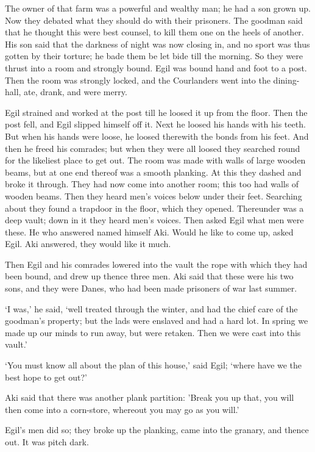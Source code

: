 The owner of that farm was a powerful and wealthy man; he had a son grown up. Now they debated what they should do with their prisoners. The goodman said that he thought this were best counsel, to kill them one on the heels of another. His son said that the darkness of night was now closing in, and no sport was thus gotten by their torture; he bade them be let bide till the morning. So they were thrust into a room and strongly bound. Egil was bound hand and foot to a post. Then the room was strongly locked, and the Courlanders went into the dining-hall, ate, drank, and were merry.

Egil strained and worked at the post till he loosed it up from the floor. Then the post fell, and Egil slipped himself off it. Next he loosed his hands with his teeth. But when his hands were loose, he loosed therewith the bonds from his feet. And then he freed his comrades; but when they were all loosed they searched round for the likeliest place to get out. The room was made with walls of large wooden beams, but at one end thereof was a smooth planking. At this they dashed and broke it through. They had now come into another room; this too had walls of wooden beams. Then they heard men's voices below under their feet. Searching about they found a trapdoor in the floor, which they opened. Thereunder was a deep vault; down in it they heard men's voices. Then asked Egil what men were these. He who answered named himself Aki. Would he like to come up, asked Egil. Aki answered, they would like it much.

Then Egil and his comrades lowered into the vault the rope with which they had been bound, and drew up thence three men. Aki said that these were his two sons, and they were Danes, who had been made prisoners of war last summer.

`I was,' he said, `well treated through the winter, and had the chief care of the goodman's property; but the lads were enslaved and had a hard lot. In spring we made up our minds to run away, but were retaken. Then we were cast into this vault.'

`You must know all about the plan of this house,' said Egil; `where have we the best hope to get out?'

Aki said that there was another plank partition: 'Break you up that, you will then come into a corn-store, whereout you may go as you will.'

Egil's men did so; they broke up the planking, came into the granary, and thence out. It was pitch dark.

